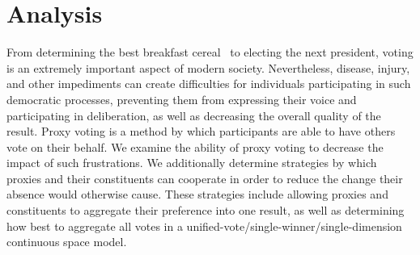%
%

\setcounter{chapter}{1}
\chapter{Analysis}\label{ch:analysis}
\thispagestyle{empty}
From determining the best breakfast cereal~\cite{Curtis2021} to electing the next
president, voting is an extremely important aspect of modern society.
Nevertheless, disease, injury, and other impediments can create difficulties for
individuals participating in such democratic processes, preventing them from
expressing their voice and participating in deliberation, as well as decreasing
the overall quality of the result.
Proxy voting is a method by which participants are able to have others vote on their
behalf.
We examine the ability of proxy voting to decrease the impact of such frustrations.
We additionally determine strategies by which proxies and their constituents can
cooperate in order to reduce the change their absence would otherwise cause.
These strategies include allowing proxies and constituents to aggregate their
preference into one result, as well as determining how best to aggregate all votes
in a unified-vote/single-winner/single-dimension continuous space model.









